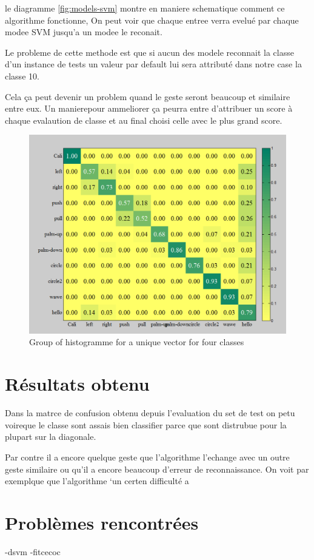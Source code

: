 le diagramme \ref{fig:models-svm} montre en maniere schematique comment ce algorithme fonctionne, On peut voir que chaque entree verra evelué par chaque modee SVM jusqu'a un modee le reconait.

Le probleme de cette methode est que si aucun des modele reconnait la classe d'un instance de tests un valeur par default lui sera attributé dans notre case la classe 10.

Cela ça peut devenir un problem quand le geste seront beaucoup et similaire entre eux. Un manierepour ammeliorer ça peurra entre d'attribuer un score à chaque evalaution de classe et au final choisi celle avec le plus grand score.


\begin{figure}[h]
  \centering
    \includegraphics[width=0.7\linewidth]{img/evaluation/confusion.png}
  \caption{Group of histogramme for a unique vector for four classes}
  \label{fig:histvector}
\end{figure}


\section*{Résultats obtenu}
Dans la matrce de confusion obtenu  depuis l'evaluation du set de test on petu voireque le classe sont assais bien classifier parce que sont distrubue pour la plupart sur la diagonale.

Par contre il a encore quelque geste que l'algorithme l'echange avec un outre geste similaire ou qu'il a encore beaucoup d'erreur de reconnaissance. On voit par exemplque que l'algorithme `un certen difficulté a 

\section*{Problèmes rencontrées}
-dsvm
-fitcecoc


